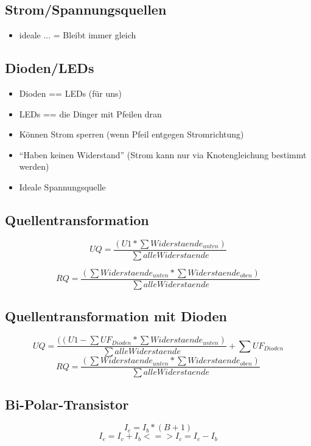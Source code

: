 \subsection{Strom/Spannungsquellen}
\begin{itemize}
\item ideale ... = Bleibt immer gleich
\end{itemize}
\subsection{Dioden/LEDs}
\begin{itemize}
\item Dioden == LEDs (für uns)
\item LEDs == die Dinger mit Pfeilen dran
\item Können Strom sperren (wenn Pfeil entgegen Stromrichtung)
\item "`Haben keinen Widerstand"' (Strom kann nur via Knotengleichung bestimmt werden)
\item Ideale Spannungsquelle
\end{itemize}
\subsection{Quellentransformation}
\[UQ = \frac{(U1 * \sum{Widerstaende_{unten}})}{\sum{alle Widerstaende}}\]


\[RQ = \frac{(\sum{Widerstaende_{unten}} * \sum{Widerstaende_{oben}})}{\sum{alle Widerstaende}}\]

\subsection{Quellentransformation mit Dioden}
\[UQ = \frac{((U1-\sum{UF_{Dioden}} * \sum{Widerstaende_{unten}})}{\sum{alle Widerstaende}} + \sum{UF_{Dioden}}\]
\[RQ = \frac{(\sum{Widerstaende_{unten}} * \sum{Widerstaende_{oben}})}{\sum{alle Widerstaende}}\]
\subsection{Bi-Polar-Transistor}
\[I_e = I_b * (B+1)\]
\[I_e = I_c + I_b <=> I_c = I_e - I_b\]


